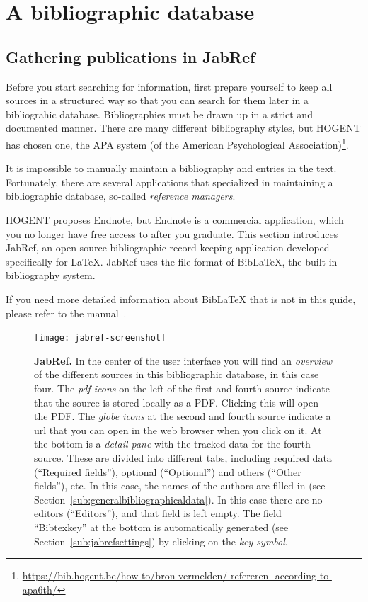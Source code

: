\chapter{A bibliographic database}
\label{ch:bibliography}

\section{Gathering publications in JabRef}
\label{sec:publicationsjabref}

Before you start searching for information, first prepare yourself to keep all sources in a structured way so that you can search for them later in a bibliograhic database. Bibliographies must be drawn up in a strict and documented manner. There are many different bibliography styles, but HOGENT has chosen one, the APA system (of the American Psychological Association)\footnote{\url{https://bib.hogent.be/how-to/bron-vermelden/ refereren -according to-apa6th/}}.

It is impossible to manually maintain a bibliography and entries in the text. Fortunately, there are several applications that specialized in maintaining a bibliographic database, so-called \emph{reference managers}.

HOGENT proposes Endnote, but Endnote is a commercial application, which you no longer have free access to after you graduate. This section introduces JabRef, an open source bibliographic record keeping application developed specifically for {\LaTeX}. JabRef uses the file format of Bib{\LaTeX}, the built-in bibliography system.

If you need more detailed information about Bib{\LaTeX} that is not in this guide, please refer to the manual~\autocite{LehmanEtAl2016}.

\begin{figure}
  \centering
  \texttt{[image: jabref-screenshot]}
  \caption[JabRef]{\textbf{JabRef.} In the center of the user interface you will find an \emph{overview} of the different sources in this bibliographic database, in this case four. The \emph{pdf-icons} on the left of the first and fourth source indicate that the source is stored locally as a PDF. Clicking this will open the PDF. The \emph{globe icons} at the second and fourth source indicate a url that you can open in the web browser when you click on it. At the bottom is a \emph{detail pane} with the tracked data for the fourth source. These are divided into different tabs, including required data (``Required fields''), optional (``Optional'') and others (``Other fields''), etc. In this case, the names of the authors are filled in (see Section~\ref{sub:generalbibliographicaldata}). In this case there are no editors (``Editors''), and that field is left empty. The field ``Bibtexkey'' at the bottom is automatically generated (see Section~\ref{sub:jabrefsettings}) by clicking on the \emph{key symbol}.}
  \label{fig:jabref}
\end{figure}

